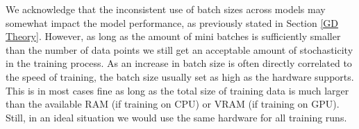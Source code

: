 We acknowledge that the inconsistent use of batch sizes across models may somewhat 
impact the model performance, as previously stated in Section \ref{GD Theory}.
However, as long as the amount of mini batches is sufficiently smaller than the number of data points we 
still get an acceptable amount of stochasticity in the training process. As an increase 
in batch size is often directly correlated to the speed of training, the batch size usually set as high as the hardware supports. This is in most cases fine as long 
as the total size of training data is much larger than the available RAM (if training on CPU) or VRAM (if training on GPU).
Still, in an ideal situation we would use the same hardware for all training runs.

